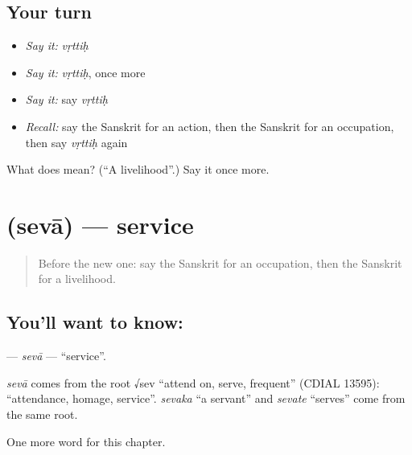 \subsection*{Your turn}
\begin{itemize}
\raggedright
  \item \emph{Say it:} \emph{vṛttiḥ}
  \item \emph{Say it:} \emph{vṛttiḥ}, once more
  \item \emph{Say it:} say \emph{vṛttiḥ}
  \item \emph{Recall:} say the Sanskrit for an action, then the Sanskrit for an occupation, then say \emph{vṛttiḥ} again
\end{itemize}

\begin{tcolorbox}[breakable,colback=teal!4,colframe=teal!35!black,title={Before you move on}]
What does  mean? (\textquotedblleft{}A livelihood\textquotedblright{}.) Say it once more.
\end{tcolorbox}
\section[\texorpdfstring{\sk{सेवा} (sevā)}{सेवा (sevā)}]{ (sevā) — service}

\label{lesson:SA-C170-seva}



\begin{quote}
Before the new one: say the Sanskrit for an occupation, then the Sanskrit for a livelihood.
\end{quote}

\subsection*{You'll want to know: }
\textbf{} — \emph{sevā} — \textquotedblleft{}service\textquotedblright{}.

\begin{cousinweb}
\emph{sevā} comes from the root √sev \textquotedblleft{}attend on, serve, frequent\textquotedblright{} (CDIAL 13595): \textquotedblleft{}attendance, homage, service\textquotedblright{}. \emph{sevaka} \textquotedblleft{}a servant\textquotedblright{} and \emph{sevate} \textquotedblleft{}serves\textquotedblright{} come from the same root.
\end{cousinweb}

\begin{grammarlens}[title={What you've built}]
One more word for this chapter.
\end{grammarlens}

